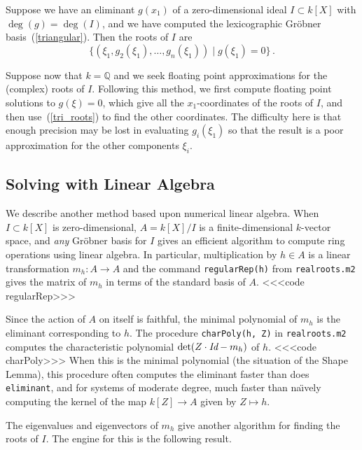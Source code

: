 Suppose we have an eliminant $g(x_1)$ of a zero-dimensional 
ideal  $I\subset k[X]$ with $\deg(g)=\deg(I)$, and we have computed the
lexicographic Gr\"obner basis~(\ref{triangular}). 
Then the roots of $I$ are
%
\begin{equation}\label{tri_roots}
   \{ (\xi_1,g_2(\xi_1), \ldots, g_n(\xi_1))\mid g(\xi_1)=0\}\,.
\end{equation}


Suppose now that $k={\mathbb Q}$ and we seek floating point approximations
for the (complex) roots of $I$.
Following this method, we first compute floating point solutions to
$g(\xi)=0$, which give all the $x_1$-coordinates of the roots of $I$,  and
then use~(\ref{tri_roots}) to find the other coordinates.
The difficulty here is that enough precision may be lost in evaluating
$g_i(\xi_1)$ so that the result is a poor approximation for the other
components $\xi_i$.


\subsection{Solving with Linear Algebra}
We describe another method based upon numerical linear algebra.
When $I\subset k[X]$ is zero-dimensional, $A=k[X]/I$ is a finite-dimensional 
$k$-vector space, and {\it any} Gr\"obner basis for $I$ gives an efficient
algorithm to compute ring operations using linear algebra.
In particular, multiplication by $h\in A$ is a linear transformation 
$m_h:A\to A$ and the command {\tt regularRep(h)} from 
{\tt realroots.m2} gives the matrix of $m_h$ in
terms of the standard basis of $A$.
%
<<<code regularRep>>>
%

Since the action of $A$ on itself is faithful, the minimal polynomial of 
$m_h$ is the eliminant corresponding to $h$.
The procedure {\tt charPoly(h, Z)} in {\tt realroots.m2}
computes the characteristic polynomial 
$\det(Z\cdot\mbox{\it Id} - m_h)$ of $h$.
%
<<<code charPoly>>>
%
When this is the minimal polynomial (the situation of the Shape Lemma),
this procedure often computes the eliminant faster than does 
{\tt eliminant}, and for systems of moderate degree, much faster than
na\"\i vely computing the kernel of the map $k[Z]\to A$ given by $Z\mapsto h$.

The eigenvalues and eigenvectors of $m_h$ give another algorithm for finding
the roots of $I$.
The engine for this is the following result.
\medskip

